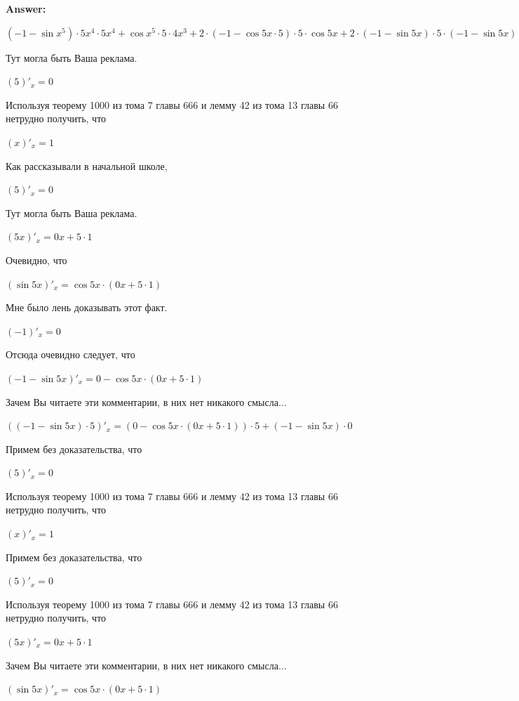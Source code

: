 \documentclass[12pt,a4paper,fleqn]{article}
\theoremstyle{definition}
\begin{document}
\textbf{Answer:}

$( -1  - \sin{ x }^{ 5 }) \cdot  5 { x }^{ 4 } \cdot  5 { x }^{ 4 } + \cos{ x }^{ 5 } \cdot  5  \cdot  4 { x }^{ 3 } +  2  \cdot ( -1  - \cos 5  x  \cdot  5 ) \cdot  5  \cdot \cos 5  x  +  2  \cdot ( -1  - \sin 5  x ) \cdot  5  \cdot ( -1  - \sin 5  x ) \cdot  5 $

Тут могла быть Ваша реклама. 

$( 5 )'_{x} =  0 $

Используя теорему 1000 из тома 7 главы 666 и лемму 42 из тома 13 главы 66 нетрудно получить, что 

$( x )'_{x} =  1 $

Как рассказывали в начальной школе, 

$( 5 )'_{x} =  0 $

Тут могла быть Ваша реклама. 

$( 5  x )'_{x} =  0  x  +  5  \cdot  1 $

Очевидно, что 

$(\sin 5  x )'_{x} = \cos 5  x  \cdot ( 0  x  +  5  \cdot  1 )$

Мне было лень доказывать этот факт.

$( -1 )'_{x} =  0 $

Отсюда очевидно следует, что 

$( -1  - \sin 5  x )'_{x} =  0  - \cos 5  x  \cdot ( 0  x  +  5  \cdot  1 )$

Зачем Вы читаете эти комментарии, в них нет никакого смысла... 

$(( -1  - \sin 5  x ) \cdot  5 )'_{x} = ( 0  - \cos 5  x  \cdot ( 0  x  +  5  \cdot  1 )) \cdot  5  + ( -1  - \sin 5  x ) \cdot  0 $

Примем без доказательства, что 

$( 5 )'_{x} =  0 $

Используя теорему 1000 из тома 7 главы 666 и лемму 42 из тома 13 главы 66 нетрудно получить, что 

$( x )'_{x} =  1 $

Примем без доказательства, что 

$( 5 )'_{x} =  0 $

Используя теорему 1000 из тома 7 главы 666 и лемму 42 из тома 13 главы 66 нетрудно получить, что 

$( 5  x )'_{x} =  0  x  +  5  \cdot  1 $

Зачем Вы читаете эти комментарии, в них нет никакого смысла... 

$(\sin 5  x )'_{x} = \cos 5  x  \cdot ( 0  x  +  5  \cdot  1 )$
\end{document}
